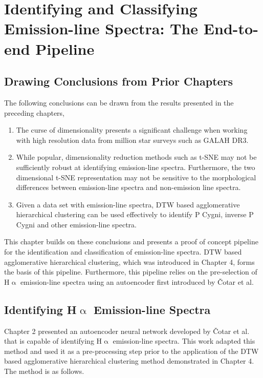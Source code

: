 \chapter{Identifying and Classifying Emission-line Spectra: The End-to-end Pipeline}

\section{Drawing Conclusions from Prior Chapters}

The following conclusions can be drawn from the results presented in the preceding chapters,

\begin{enumerate}
    \item The curse of dimensionality presents a significant challenge when working with high resolution data from million star surveys such as GALAH DR3. 
    \item While popular,  dimensionality reduction methods such as t-SNE may not be sufficiently robust at identifying emission-line spectra. Furthermore, the two dimensional t-SNE representation may not be sensitive to the morphological differences between emission-line spectra and non-emission line spectra.
    \item Given a data set with emission-line spectra, DTW based agglomerative hierarchical clustering can be used effectively to identify P Cygni, inverse P Cygni and other emission-line spectra.
\end{enumerate}

This chapter builds on these conclusions and presents a proof of concept pipeline for the identification and classification of emission-line spectra. DTW based agglomerative hierarchical clustering, which  was introduced in Chapter 4, forms the basis of this pipeline. Furthermore, this pipeline relies on the pre-selection of H$\upalpha$ emission-line spectra using an autoencoder first introduced by Čotar et al.

\section{Identifying H$\upalpha$ Emission-line Spectra}

Chapter 2 presented an autoencoder neural network developed by Čotar et al. that is capable of identifying H$\upalpha$ emission-line spectra\cite{vcotar2021galah}. This work adapted this method and used it as a pre-processing step prior to the application of the DTW based agglomerative hierarchical clustering method demonstrated in Chapter 4. The method is as follows.

